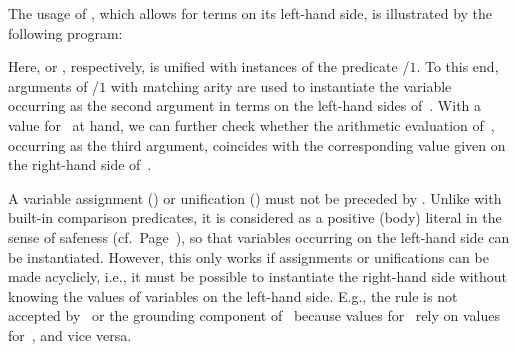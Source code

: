\begin{example}\label{ex:unify}
The usage of \code{:=},
which allows for terms on its left-hand side,
is illustrated by the following program:
%

%
Here,  or
, respectively,
is unified with instances of the predicate /$1$.
To this end,
arguments of /$1$ with matching arity
are used to instantiate the variable~ occurring
as the second argument in terms on the left-hand sides of~\code{:=}.
With a value for~ at hand,
we can further check whether the arithmetic evaluation of~,
occurring as the third argument, coincides with the 
corresponding value given on the right-hand side of~\code{:=}.
%
\eexample
\end{example}

\begin{Note}
A variable assignment (\code{=}) or unification (\code{:=})
must not be preceded by .
Unlike with built-in comparison predicates,
it is considered as
a positive (body) literal in the sense of safeness (cf.\ Page~\pageref{pg:safe}),
so that variables occurring on the left-hand side can be instantiated.
However, this only works if assignments or unifications
can be made acyclicly, i.e.,
it must be possible to instantiate the right-hand side
without knowing the values of variables on
the left-hand side.
E.g., the rule 
is not accepted by \gringo\ or the grounding component of \clingo\
because values for~ rely on values for~, and vice versa.
\index{Logic Programs!Safeness}%
%
\end{Note}

